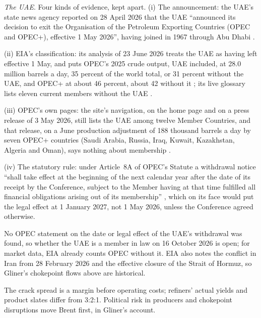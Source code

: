 \begin{qfdefinition}
\emph{The UAE}. Four kinds of evidence, kept apart. (i) The announcement: the UAE's state news agency reported on 28 April 2026 that the UAE ``announced its decision to exit the Organisation of the Petroleum Exporting Countries (OPEC and OPEC+), effective 1 May 2026'', having joined in 1967 through Abu Dhabi \citep[pp.~1--2]{wam-uae-opec-2026}.

(ii) EIA's classification: its analysis of 23 June 2026 treats the UAE as having left effective 1 May, and puts OPEC's 2025 crude output, UAE included, at 28.0 million barrels a day, 35 percent of the world total, or 31 percent without the UAE, and OPEC+ at about 46 percent, about 42 without it \citep[web page]{eia-uae-opec-2026}; its live glossary lists eleven current members without the UAE \citep[glossary entry]{eia-opec-glossary}.

(iii) OPEC's own pages: the site's navigation, on the home page and on a press release of 3 May 2026, still lists the UAE among twelve Member Countries, and that release, on a June production adjustment of 188 thousand barrels a day by seven OPEC+ countries (Saudi Arabia, Russia, Iraq, Kuwait, Kazakhstan, Algeria and Oman), says nothing about membership \citep[release and site navigation]{opec-pr-2026-05-03}.

(iv) The statutory rule: under Article~8A of OPEC's Statute a withdrawal notice ``shall take effect at the beginning of the next calendar year after the date of its receipt by the Conference, subject to the Member having at that time fulfilled all financial obligations arising out of its membership'' \citep[2021 edition, Art.~8A, PDF p.~12]{opec-statute-2021}, which on its face would put the legal effect at 1 January 2027, not 1 May 2026, unless the Conference agreed otherwise.

No OPEC statement on the date or legal effect of the UAE's withdrawal was found, so whether the UAE is a member in law on 16 October 2026 is open; for market data, EIA already counts OPEC without it. EIA also notes the conflict in Iran from 28 February 2026 and the effective closure of the Strait of Hormuz, so Gliner's chokepoint flows above are historical.

 The crack spread is a margin before operating costs; refiners' actual yields and product slates differ from 3:2:1. Political risk in producers and chokepoint disruptions move Brent first, in Gliner's account.


\end{qfdefinition}
